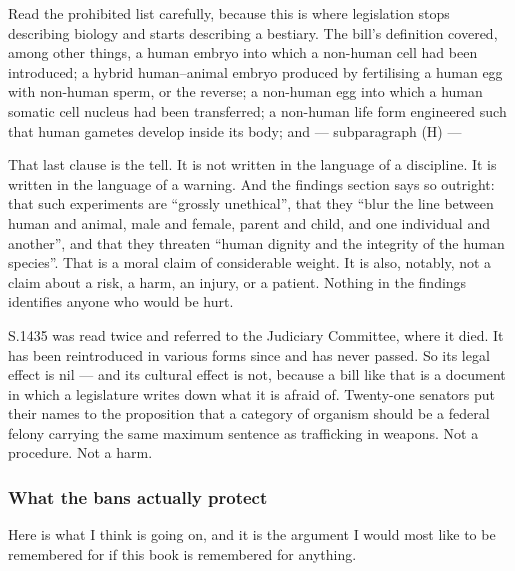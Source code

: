 Read the prohibited list carefully, because this is where legislation stops describing biology and
starts describing a bestiary. The bill's definition covered, among other things, a human embryo
into which a non-human cell had been introduced; a hybrid human--animal embryo produced by
fertilising a human egg with non-human sperm, or the reverse; a non-human egg into which a human
somatic cell nucleus had been transferred; a non-human life form engineered such that human gametes
develop inside its body; and --- subparagraph (H) --- 

That last clause is the tell. It is not written in the language of a discipline. It is written in
the language of a warning. And the findings section says so outright: that such experiments are
``grossly unethical'', that they ``blur the line between human and animal, male and female, parent
and child, and one individual and another'', and that they threaten ``human dignity and the
integrity of the human species''. That is a moral claim of considerable weight. It is also,
notably, not a claim about a risk, a harm, an injury, or a patient. Nothing in the findings
identifies anyone who would be hurt.

S.1435 was read twice and referred to the Judiciary Committee, where it died. It has been
reintroduced in various forms since and has never passed. So its legal effect is nil --- and its
cultural effect is not, because a bill like that is a document in which a legislature writes down
what it is afraid of. Twenty-one senators put their names to the proposition that a category of
organism should be a federal felony carrying the same maximum sentence as trafficking in weapons.
Not a procedure. Not a harm. 

\subsubsection*{What the bans actually protect}

Here is what I think is going on, and it is the argument I would most like to be remembered for if
this book is remembered for anything.

